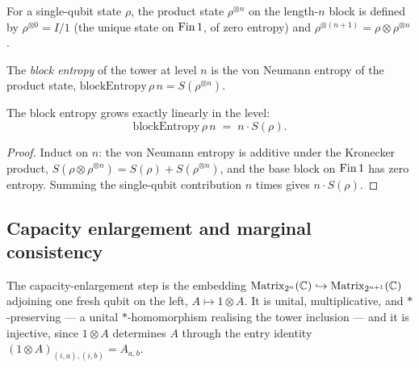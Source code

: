 \begin{definition}\label{rhoPow}
  \leanok
  For a single-qubit state \(\rho\), the product state \(\rho^{\otimes n}\) on the length-\(n\) block
  is defined by \(\rho^{\otimes 0} = I/1\) (the unique state on \(\operatorname{Fin} 1\), of zero entropy) and
  \(\rho^{\otimes(n+1)} = \rho\otimes\rho^{\otimes n}\).
\end{definition}

\begin{definition}\label{blockEntropy}
  \leanok
  The \emph{block entropy} of the tower at level \(n\) is the von Neumann entropy of the product
  state, \(\mathrm{blockEntropy}\,\rho\,n = S(\rho^{\otimes n})\).
\end{definition}

\begin{theorem}\label{blockEntropy_eq}
  \leanok
  The block entropy grows exactly linearly in the level:
  \[
    \mathrm{blockEntropy}\,\rho\,n \;=\; n\cdot S(\rho).
  \]
\end{theorem}
\begin{proof}\leanok
  Induct on \(n\): the von Neumann entropy is additive under the Kronecker product,
  \(S(\rho\otimes\rho^{\otimes n}) = S(\rho) + S(\rho^{\otimes n})\), and the base block on \(\operatorname{Fin} 1\)
  has zero entropy. Summing the single-qubit contribution \(n\) times gives \(n\cdot S(\rho)\).
\end{proof}

\subsection{Capacity enlargement and marginal consistency}

\begin{definition}\label{shiftAdjoinQubit}
  \leanok
  The capacity-enlargement step is the embedding
  \(\operatorname{Matrix}_{2^{n}}(\mathbb{C})\hookrightarrow\operatorname{Matrix}_{2^{n+1}}(\mathbb{C})\) adjoining one fresh qubit on the left,
  \(A\mapsto 1\otimes A\). It is unital, multiplicative, and \(*\)-preserving --- a unital
  \(*\)-homomorphism realising the tower inclusion --- and it is injective, since \(1\otimes A\)
  determines \(A\) through the entry identity \((1\otimes A)_{(i,a),(i,b)} = A_{a,b}\).
\end{definition}

